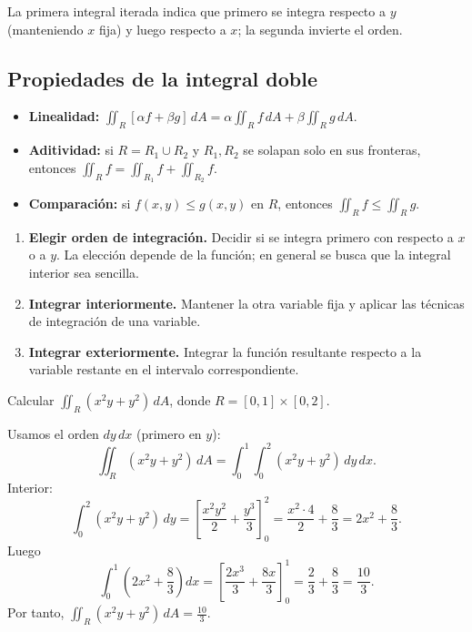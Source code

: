 La primera integral iterada indica que primero se integra respecto a $y$ (manteniendo $x$ fija) y luego respecto a $x$; la segunda invierte el orden.

\subsection{Propiedades de la integral doble}

\begin{itemize}
    \item \textbf{Linealidad:} $\iint_R [\alpha f+\beta g]\,dA = \alpha\iint_R f\,dA + \beta\iint_R g\,dA$.
    \item \textbf{Aditividad:} si $R=R_1\cup R_2$ y $R_1,R_2$ se solapan solo en sus fronteras, entonces $\iint_R f = \iint_{R_1} f + \iint_{R_2} f$.
    \item \textbf{Comparación:} si $f(x,y)\le g(x,y)$ en $R$, entonces $\iint_R f\le \iint_R g$.
\end{itemize}

\begin{pasos}
\begin{enumerate}
    \item \textbf{Elegir orden de integración.} Decidir si se integra primero con respecto a $x$ o a $y$. La elección depende de la función; en general se busca que la integral interior sea sencilla.
    \item \textbf{Integrar interiormente.} Mantener la otra variable fija y aplicar las técnicas de integración de una variable.
    \item \textbf{Integrar exteriormente.} Integrar la función resultante respecto a la variable restante en el intervalo correspondiente.
\end{enumerate}
\end{pasos}

\begin{example}
Calcular $\displaystyle\iint_R (x^2 y + y^2)\,dA$, donde $R=[0,1]\times[0,2]$.
\end{example}

\begin{myproof}
Usamos el orden $dy\,dx$ (primero en $y$):
\[
\iint_R (x^2 y + y^2)\,dA
= \int_0^1\int_0^2 (x^2 y + y^2)\,dy\,dx.
\]
Interior:
\[
\int_0^2 (x^2 y + y^2)\,dy
= \left[\frac{x^2 y^2}{2} + \frac{y^3}{3}\right]_0^2
= \frac{x^2\cdot 4}{2} + \frac{8}{3}
= 2x^2+\frac{8}{3}.
\]
Luego
\[
\int_0^1 \left(2x^2+\frac{8}{3}\right)dx
= \left[\frac{2x^3}{3}+\frac{8x}{3}\right]_0^1
= \frac{2}{3}+\frac{8}{3}=\frac{10}{3}.
\]
Por tanto, $\displaystyle\iint_R (x^2 y + y^2)\,dA = \frac{10}{3}$.
\end{myproof}


